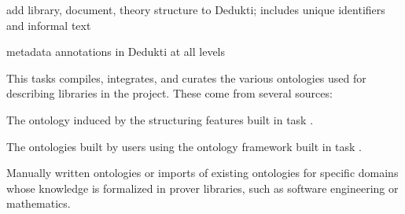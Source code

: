 \begin{workpackage}[id=structuring,wphases=0-48,type=RTD,
  short=Structured Theories and Metadata,%
  title=Structured Theories and Metadata,
  lead=Fau,
  BolRM=6,
  TumRM=6,
  FauRM=48,
  SacRM=48]
\begin{tasklist}
\begin{task}[id=strlibstructure,title=Library Structure,lead=Fau,FauRM=18]
add library, document, theory structure to Dedukti; includes unique identifiers and informal text

%
%
\end{task} 

\begin{task}[id=strdofimpl,title=Ontological Framework for Meta-Data,lead=Sac,SacRM=18]
metadata annotations in Dedukti at all levels
\end{task} 

\begin{task}[id=strrefonto,title=Reference Ontology,lead=Fau,FauRM=6,SacRM=6]
This tasks compiles, integrates, and curates the various ontologies used for describing libraries in the project.
These come from several sources:
\begin{compactitem}
 \item The ontology induced by the structuring features built in task .
 \item The ontologies built by users using the ontology framework built in task .
 \item Manually written ontologies or imports of existing ontologies for specific domains whose knowledge is formalized in prover libraries, such as software engineering or mathematics.
\end{compactitem}
\end{task} 


\end{tasklist}
\end{workpackage}
